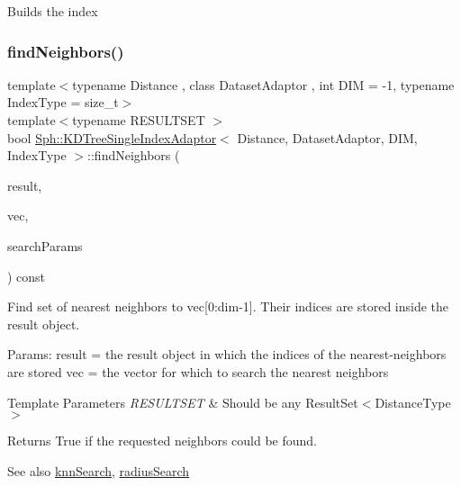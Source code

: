 Builds the index \hypertarget{classSph_1_1KDTreeSingleIndexAdaptor_a444955d9248884e7fcb1fb238c3b0105}{}\label{classSph_1_1KDTreeSingleIndexAdaptor_a444955d9248884e7fcb1fb238c3b0105} 
\subsubsection{\texorpdfstring{find\+Neighbors()}{findNeighbors()}}
{\footnotesize\ttfamily template$<$typename Distance , class Dataset\+Adaptor , int D\+IM = -\/1, typename Index\+Type  = size\+\_\+t$>$ \\
template$<$typename R\+E\+S\+U\+L\+T\+S\+ET $>$ \\
bool \hyperlink{classSph_1_1KDTreeSingleIndexAdaptor}{Sph\+::\+K\+D\+Tree\+Single\+Index\+Adaptor}$<$ Distance, Dataset\+Adaptor, D\+IM, Index\+Type $>$\+::find\+Neighbors (\begin{DoxyParamCaption}\item[{R\+E\+S\+U\+L\+T\+S\+ET \&}]{result,  }\item[{const \hyperlink{classBasicVector}{Vector} \&}]{vec,  }\item[{const \hyperlink{structSph_1_1SearchParams}{Search\+Params} \&}]{search\+Params }\end{DoxyParamCaption}) const\hspace{0.3cm}{\ttfamily [inline]}}

Find set of nearest neighbors to vec\mbox{[}0\+:dim-\/1\mbox{]}. Their indices are stored inside the result object.

Params\+: result = the result object in which the indices of the nearest-\/neighbors are stored vec = the vector for which to search the nearest neighbors


\begin{DoxyTemplParams}{Template Parameters}
{\em R\+E\+S\+U\+L\+T\+S\+ET} & Should be any Result\+Set$<$\+Distance\+Type$>$ \\
\hline
\end{DoxyTemplParams}
\begin{DoxyReturn}{Returns}
True if the requested neighbors could be found. 
\end{DoxyReturn}
\begin{DoxySeeAlso}{See also}
\hyperlink{classSph_1_1KDTreeSingleIndexAdaptor_ab2712a5eafbf9344143d2eadff15e802}{knn\+Search}, \hyperlink{classSph_1_1KDTreeSingleIndexAdaptor_a1b00ad9bd5a4e2e265011ad4d2265e03}{radius\+Search} 
\end{DoxySeeAlso}
\hypertarget{classSph_1_1KDTreeSingleIndexAdaptor_a977528560c451d99bc006f3a2084b0a4}{}\label{classSph_1_1KDTreeSingleIndexAdaptor_a977528560c451d99bc006f3a2084b0a4} 
